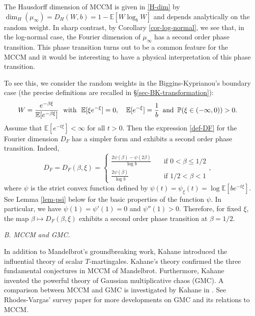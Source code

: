 \documentclass[12pt]{amsart}
\theoremstyle{definition}
\theoremstyle{remark}
\newcommand{\E}{\mathbb{E}}
\newcommand{\PP}{\mathbb{P}}
\newcommand{\an}{\text{\, and \,}}
\numberwithin{equation}{section}
\begin{document}
The Hausdorff dimension of MCCM is given in \eqref{H-dim} by $\dim_H(\mu_\infty) = D_H(W,b)= 1 - \E[W\log_b W]$ and  depends analytically on the random weight.  In sharp contrast, by Corollary \ref{cor-log-normal}, we see that, in the log-normal case,  the Fourier dimension of $\mu_\infty$ has a second order phase transition. This phase transition turns out to be a common feature for the MCCM and it would be interesting to have a physical interpretation of this phase transition. 

To see this, we consider the  random weights in  the Biggins-Kyprianou's boundary case (the precise definitions are recalled in \S \ref{sec-BK-transformation}): 
\[
W= \frac{e^{-\beta \xi}}{\E[e^{-\beta \xi}]}  \text{\,\, with \,\,}
\E[\xi e^{-\xi}] = 0, \quad \E[e^{-\xi}] = \frac{1}{b} \an 
\PP(\xi\in (-\infty, 0))> 0.
\]  
Assume that $\E[e^{-t \xi}]<\infty$ for all $t> 0$. Then the expression \eqref{def-DF} for the Fourier dimension $D_F$ has a simpler form and exhibits a second order phase transition. Indeed, 
\[
D_F =D_F(\beta, \xi)=  \left\{
\begin{array}{lc}
\displaystyle \frac{2 \psi(\beta)-  \psi(2\beta) }{\log b} & \quad \text{if $0<\beta\le 1/2$}
\\
\displaystyle  \frac{2\psi(\beta)}{\log b} & \quad \text{if $1/2<\beta<1$}
\end{array}
\right. ,
\]
where $\psi$ is the strict convex function defined by 
$
\psi(t) = \psi_\xi(t)=\log \E[be^{-t\xi}]. 
$
See Lemma \ref{lem-psi} below for the basic properties of the function $\psi$.  In particular, we have $\psi(1)= \psi'(1)=0$ and $\psi''(1)>0$.  Therefore, for fixed $\xi$,  the map $\beta \mapsto D_F(\beta, \xi)$ exhibits a second order phase transition at $\beta = 1/2$. 





{\flushleft \it  B. MCCM and GMC.} 

In addition to Mandelbrot’s groundbreaking work, Kahane introduced the influential theory of scalar $T$-martingales. Kahane's theory  confirmed  the three fundamental conjectures in MCCM  of Mandelbrot.  Furthermore, Kahane invented   the powerful theory of  Gaussian multiplicative chaos (GMC). A comparison between MCCM and GMC is investigated by Kahane in \cite{Ka85b}.  See Rhodes-Vargas' survey paper \cite{RV14} for more developments on GMC and its relations to MCCM. 
\end{document}
